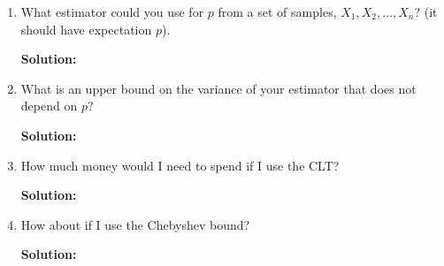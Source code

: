 \documentclass{article}
\newenvironment{solution}{

            \color{blue} \smallskip \textbf{Solution:}}{}
\begin{document}
\begin{enumerate}
\begin{enumerate}
            \item What estimator could you use for $p$ from a set of samples, $X_1, X_2, \ldots, X_n$? (it should have expectation $p$).
            \begin{solution}
            \end{solution}
            \item What is an upper bound on the variance of your estimator that does not depend on $p$?
            \begin{solution}
            \end{solution}
            \item How much money would I need to spend if I use the CLT?
            \begin{solution}
            \end{solution}
            \item How about if I use the Chebyshev bound?
            \begin{solution}
            \end{solution}
        \end{enumerate}
     \end{enumerate}
\end{document}
